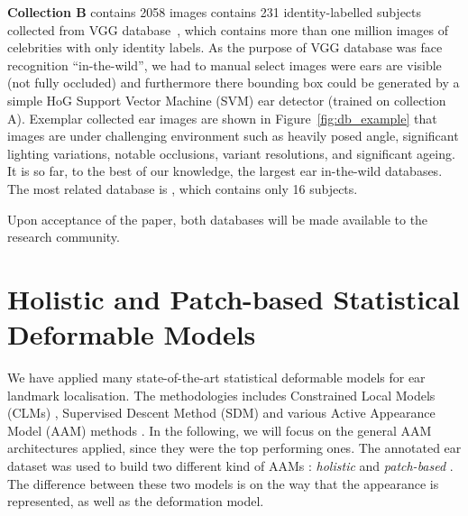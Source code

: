 \textbf{Collection B} contains 2058 images contains 231 identity-labelled subjects collected from VGG database~\cite{Parkhi15}, which contains more than one million images of celebrities with only identity labels. As the purpose of VGG database was face recognition ``in-the-wild'', we had to manual select images were ears are visible (not fully occluded) and furthermore there bounding box could be 
generated by a simple HoG Support Vector Machine (SVM) \cite{Dalal2005}  ear detector (trained on collection A). Exemplar collected ear images are shown in Figure~\ref{fig:db_example} that images are under challenging environment such as heavily posed angle, significant lighting variations, notable occlusions, variant resolutions, and significant ageing. It is so far, to the best of our knowledge, the largest ear in-the-wild databases. The most related database is \cite{emervsivc2015ear}, which contains only 16 subjects. 
\label{600EW}

Upon acceptance of the paper, both databases will be made available to the research community.





\section{Holistic and Patch-based Statistical Deformable Models}

We have applied many state-of-the-art statistical deformable models for ear landmark localisation. The methodologies includes Constrained Local Models (CLMs) \cite{cristinacce2006feature}, Supervised Descent Method (SDM) \cite{xiong2013supervised} and various Active Appearance Model (AAM) methods \cite{Cootes2001, Matthews2004, Tzimiropoulos2014, antonakos2015feature}. In the following, we will focus on the general AAM architectures applied, since they were the top performing ones. The annotated ear dataset was used to  build two different kind of AAMs \cite{Cootes2001, Matthews2004}: \emph{holistic} \cite{ramnath2008increasing, Amberg2009, anderson2014using, antonakos2015feature} and \emph{patch-based} \cite{Tzimiropoulos2014}. The difference between these two models is on the way that the appearance is represented, as well as the deformation model.


